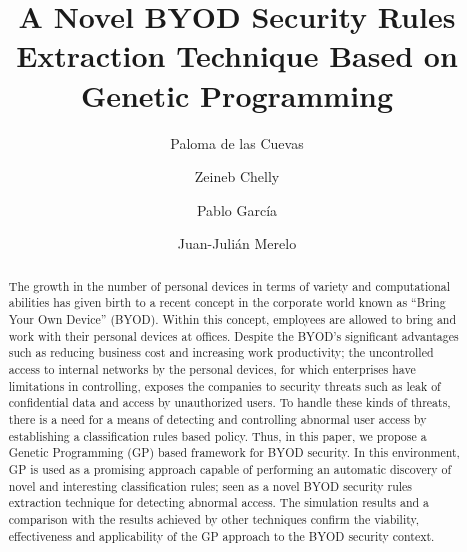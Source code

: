 \documentclass[runningheads,a4paper]{llncs}
\begin{document}
\mainmatter  %

\title{A Novel BYOD Security Rules Extraction Technique Based on Genetic Programming}


%
\author{Paloma de las Cuevas %
\and Zeineb Chelly \and Pablo Garc\'ia \and Juan-Juli\'an Merelo }
%


\maketitle


\begin{abstract}
The growth in the number of personal devices in terms of variety and computational
abilities has given birth to a recent concept in the corporate world
known as ``Bring Your Own Device'' (BYOD).
Within this concept,
employees are allowed to bring and work with their personal devices at
offices. Despite the BYOD's significant advantages such as reducing
business cost and increasing work productivity; the uncontrolled
access to internal networks by the personal devices, for which
enterprises have limitations in controlling, exposes the companies to
security threats such as leak of confidential data and access by
unauthorized users. To handle these kinds of threats,
 there
is a need for a means of detecting and controlling abnormal user
access by establishing a classification rules based policy. Thus, in
this paper, we propose a Genetic Programming (GP) based framework for
BYOD security. In this environment, GP is used as a promising approach
capable of performing an automatic discovery of novel and interesting
classification rules; seen as a novel BYOD security rules extraction
technique for detecting abnormal access. The simulation results and a
comparison with the results achieved by other techniques confirm the
viability, effectiveness and applicability of the GP approach to the
BYOD security context.
\end{abstract}
\end{document}
